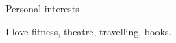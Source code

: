 \begin{rubric}{Personal interests}

\entry*[]
I love fitness, theatre, travelling, books.


\end{rubric}
